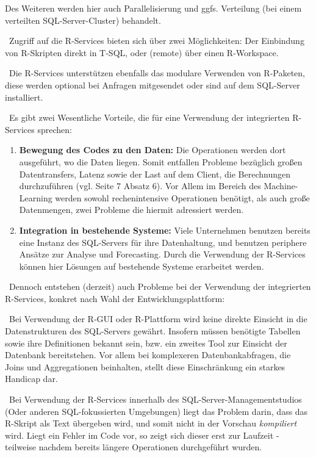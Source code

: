 Des Weiteren werden hier auch Parallelisierung und ggfs. Verteilung (bei einem verteilten SQL-Server-Cluster) behandelt.

~\newline Zugriff auf die R-Services bieten sich über zwei Möglichkeiten: Der Einbindung von R-Skripten direkt in T-SQL, oder (remote) über einen R-Workspace. 

~\newline Die R-Services unterstützen ebenfalls das modulare Verwenden von R-Paketen, diese werden optional bei Anfragen mitgesendet oder sind auf dem SQL-Server installiert. 

~\newline Es gibt zwei Wesentliche Vorteile, die für eine Verwendung der integrierten R-Services sprechen:

\begin{enumerate}
	\item \textbf{Bewegung des Codes zu den Daten:} Die Operationen werden dort ausgeführt, wo die Daten liegen. Somit entfallen Probleme bezüglich großen Datentransfers, Latenz sowie der Last auf dem Client, die Berechnungen durchzuführen (vgl. \cite{SQLData} Seite 7 Absatz 6). Vor Allem im Bereich des Machine-Learning werden sowohl rechenintensive Operationen benötigt, als auch große Datenmengen, zwei Probleme die hiermit adressiert werden. 
	\item \textbf{Integration in bestehende Systeme:} Viele Unternehmen benutzen bereits eine Instanz des SQL-Servers für ihre Datenhaltung, und benutzen periphere Ansätze zur Analyse und Forecasting. Durch die Verwendung der R-Services können hier Lösungen auf bestehende Systeme erarbeitet werden. 
\end{enumerate}

~\newline Dennoch entstehen (derzeit) auch Probleme bei der Verwendung der integrierten R-Services, konkret nach Wahl der Entwicklungsplattform: 

~\newline Bei Verwendung der R-GUI oder R-Plattform wird keine direkte Einsicht in die Datenstrukturen des SQL-Servers gewährt. Insofern müssen benötigte Tabellen sowie ihre Definitionen bekannt sein, bzw. ein zweites Tool zur Einsicht der Datenbank bereitstehen. Vor allem bei komplexeren Datenbankabfragen, die Joins und Aggregationen beinhalten, stellt diese Einschränkung ein starkes Handicap dar. 

~\newline Bei Verwendung der R-Services innerhalb des SQL-Server-Managementstudios (Oder anderen SQL-fokussierten Umgebungen) liegt das Problem darin, dass das R-Skript als Text übergeben wird, und somit nicht in der Vorschau \textit{kompiliert} wird. Liegt ein Fehler im Code vor, so zeigt sich dieser erst zur Laufzeit - teilweise nachdem bereits längere Operationen durchgeführt wurden. 

